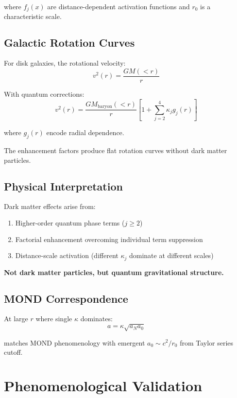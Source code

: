 \documentclass[11pt,a4paper]{article}
\theoremstyle{definition}
\theoremstyle{remark}
\begin{document}
	where $f_j(x)$ are distance-dependent activation functions and $r_0$ is a characteristic scale.
	
	\subsection{Galactic Rotation Curves}
	
	For disk galaxies, the rotational velocity:
	\begin{equation}
		v^2(r) = \frac{GM(<r)}{r}
	\end{equation}
	
	With quantum corrections:
	\begin{equation}\label{eq:rotation_curve}
		\boxed{v^2(r) = \frac{GM_{\text{baryon}}(<r)}{r}\left[1 + \sum_{j=2}^4 \kappa_j g_j(r)\right]}
	\end{equation}
	
	where $g_j(r)$ encode radial dependence.
	
	The enhancement factors produce flat rotation curves without dark matter particles.
	
	\subsection{Physical Interpretation}
	
	Dark matter effects arise from:
	\begin{enumerate}
		\item Higher-order quantum phase terms ($j \geq 2$)
		\item Factorial enhancement overcoming individual term suppression
		\item Distance-scale activation (different $\kappa_j$ dominate at different scales)
	\end{enumerate}
	
	\textbf{Not dark matter particles, but quantum gravitational structure.}
	
	\subsection{MOND Correspondence}
	
	At large $r$ where single $\kappa$ dominates:
	\begin{equation}
		a = \kappa \sqrt{a_N a_0}
	\end{equation}
	
	matches MOND phenomenology with emergent $a_0 \sim c^2/r_0$ from Taylor series cutoff.
	
	\section{Phenomenological Validation}
	
\end{document}
